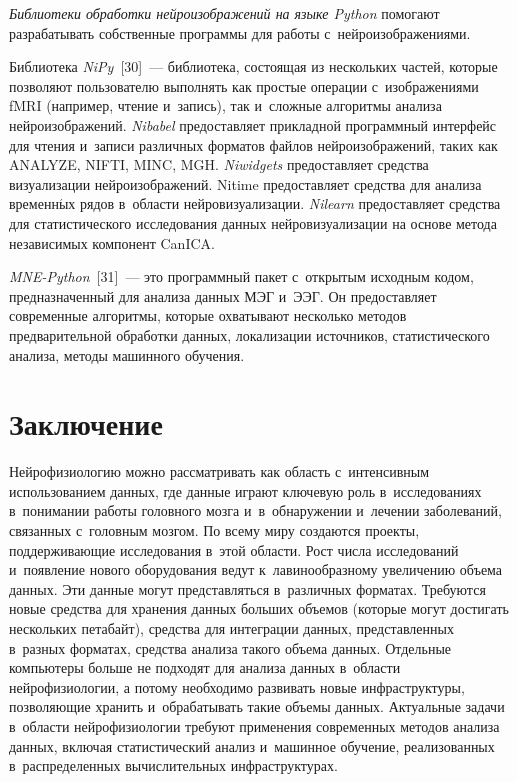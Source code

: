 \begin{multicols}{2}
{}
    
    \textit{Библиотеки обработки нейроизображений на языке Python} 
помогают разрабатывать собственные программы для работы 
с~нейроизображениями.
    
    Библиотека \textit{NiPy}~[30]~--- библиотека, состоящая из нескольких 
частей, которые позволяют пользователю выполнять как простые операции 
с~изоб\-ра\-же\-ни\-ями fMRI (например, чтение и~запись), так и~сложные алгоритмы 
анализа нейроизображений. \textit{Nibabel} предоставляет прикладной 
программный интерфейс для чтения и~записи различных форматов файлов 
нейроизображений, таких как \mbox{ANALYZE}, NIFTI, MINC, MGH. 
\textit{Niwidgets} пред\-остав\-ля\-ет средства визуализации нейроизображений. 
Nitime пред\-остав\-ля\-ет средства для анализа временн$\acute{\mbox{ы}}$х рядов в~области 
нейровизуализации. \textit{Nilearn} пред\-остав\-ля\-ет средства для 
статистического исследования данных нейровизуализации на основе метода 
независимых компонент CanICA.
    
    \textit{MNE-Python}~[31]~--- это программный пакет с~открытым 
исходным кодом, предназначенный для анализа данных 
МЭГ и~ЭЭГ. Он пред\-остав\-ля\-ет 
современные алгоритмы, которые охватывают несколько методов 
предварительной обработки данных, локализации источников, 
статистического анализа, методы машинного обучения.

\vspace*{-6pt}

\section{Заключение}

 \vspace*{-3pt}

    Нейрофизиологию можно рассматривать как область с~интенсивным 
использованием данных, где данные играют ключевую роль в~исследованиях 
в~понимании работы головного мозга и~в~обнаружении и~лечении 
заболеваний, связанных с~головным мозгом. По всему миру создаются 
проекты, поддерживающие исследования в~этой области. Рост числа 
исследований и~появление нового оборудования ведут к~лавинообразному 
увеличению объема данных. Эти данные могут представляться в~различных 
форматах. Требуются новые средства для хранения данных больших объемов 
(которые могут достигать нескольких петабайт), средства для интеграции 
данных, представленных в~разных форматах, средства анализа такого объема 
данных. Отдельные компьютеры больше не подходят для анализа данных 
в~области нейрофизиологии, а потому необходимо развивать новые 
инфраструктуры, позволяющие хранить и~обрабатывать такие объемы 
данных. Актуальные задачи в~области нейрофизиологии требуют применения 
современных методов анализа данных, включая статистический анализ 
и~машинное обучение, реализованных в~распределенных вычислительных 
инфраструктурах.


\end{multicols}
